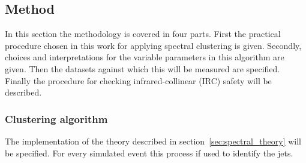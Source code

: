 \subsection{Method}
In this section the methodology is covered in four parts.
First the practical procedure chosen in this work for applying spectral clustering is given.
Secondly, choices and interpretations for the variable parameters in this algorithm are given.
Then the datasets against which this will be measured are specified.
Finally the procedure for checking infrared-collinear (IRC) safety will be described.


\subsubsection{Clustering algorithm}\label{sec:spectralmethodalgo}
    The implementation of the theory described in section~\ref{sec:spectral_theory} will be specified.
    For every simulated event this process if used to identify the jets.

